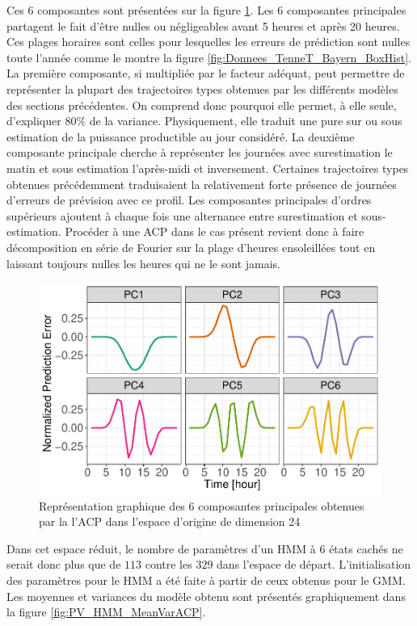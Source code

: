 \documentclass[12pt, french]{report}
\begin{document}
Ces 6 composantes sont présentées sur la figure \ref{fig:PV_HMM_ACP_PC}. Les 6 composantes principales partagent le fait d'être nulles ou négligeables avant 5 heures et après 20 heures. Ces plages horaires sont celles pour lesquelles les erreurs de prédiction sont nulles toute l'année comme le montre la figure \ref{fig:Donnees_TenneT_Bayern_BoxHist}. La première composante, si multipliée par le facteur adéquat, peut permettre de représenter la plupart des trajectoires types obtenues par les différents modèles des sections précédentes. On comprend donc pourquoi elle permet, à elle seule, d'expliquer $80\%$ de la variance. Physiquement, elle traduit une pure sur ou sous estimation de la puissance productible au jour considéré. La deuxième composante principale cherche à représenter les journées avec surestimation le matin et sous estimation l'après-midi et inversement. Certaines trajectoires types obtenues précédemment traduisaient la relativement forte présence de journées d'erreurs de prévision avec ce profil. Les composantes principales d'ordres supérieurs ajoutent à chaque fois une alternance entre surestimation et sous-estimation. Procéder à une ACP dans le cas présent revient donc à faire décomposition en série de Fourier sur la plage d'heures ensoleillées tout en laissant toujours nulles les heures qui ne le sont jamais.

\begin{figure}[htbp]
	\centering
	\includegraphics[width = 0.8 \linewidth]{Images/PV/ACP/ACP_PrincipalComp_6.pdf}
	\caption{Représentation graphique des 6 composantes principales obtenues par la l'ACP dans l'espace d'origine de dimension 24}
	\label{fig:PV_HMM_ACP_PC}
\end{figure}

Dans cet espace réduit, le nombre de paramètres d'un HMM à 6	 états cachés ne serait donc plus que de $113$ contre les $329$ dans l'espace de départ. L'initialisation des paramètres pour le HMM a été faite à partir de ceux obtenus pour le GMM. Les moyennes et variances du modèle obtenu sont présentés graphiquement dans la figure \ref{fig:PV_HMM_MeanVarACP}.
\end{document}

